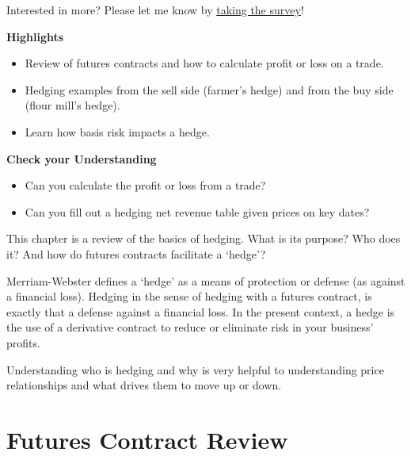 \documentclass[
  letterpaper,
  DIV=11,
  numbers=noendperiod]{scrreprt}
\providecommand{\tightlist}{%
  \setlength{\itemsep}{0pt}\setlength{\parskip}{0pt}}\usepackage{longtable,booktabs,array}
\begin{document}
{Interested in more? Please let me know by}
\href{https://forms.gle/Q3VByCQZHjfQSy9D7}{taking the survey}!

\textbf{Highlights}

\begin{itemize}
\tightlist
\item
  Review of futures contracts and how to calculate profit or loss on a
  trade.
\item
  Hedging examples from the sell side (farmer's hedge) and from the buy
  side (flour mill's hedge).
\item
  Learn how basis risk impacts a hedge.
\end{itemize}

\textbf{Check your Understanding}

\begin{itemize}
\tightlist
\item
  Can you calculate the profit or loss from a trade?
\item
  Can you fill out a hedging net revenue table given prices on key
  dates?
\end{itemize}

This chapter is a review of the basics of hedging. What is its purpose?
Who does it? And how do futures contracts facilitate a `hedge'?

Merriam-Webster defines a `hedge' as a means of protection or defense
(as against a financial loss). Hedging in the sense of hedging with a
futures contract, is exactly that a defense against a financial loss. In
the present context, a hedge is the use of a derivative contract to
reduce or eliminate risk in your business' profits.

Understanding who is hedging and why is very helpful to understanding
price relationships and what drives them to move up or down.

\hypertarget{futures-contract-review}{%
\section{Futures Contract Review}\label{futures-contract-review}}
\end{document}
